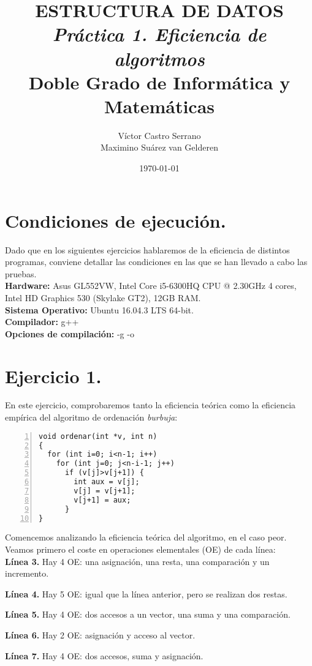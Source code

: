\documentclass[11pt,a4paper]{article}
\title{\textbf{ESTRUCTURA DE DATOS}\\
	   \textit{Práctica 1. Eficiencia de algoritmos}\\
	   \large \vspace{0.25em} Doble Grado de Informática y Matemáticas}
\author{Víctor Castro Serrano\\ Maximino Suárez van Gelderen}
\date{\today}
\begin{document}
\maketitle

\section*{Condiciones de ejecución.}

Dado que en los siguientes ejercicios hablaremos de la eficiencia de distintos programas, conviene detallar las condiciones en las que se han llevado a cabo las pruebas. \\

\textbf{Hardware:} Asus GL552VW, Intel Core i5-6300HQ CPU @ 2.30GHz 4 cores, Intel HD Graphics 530 (Skylake GT2), 12GB RAM. \\
\textbf{Sistema Operativo:} Ubuntu 16.04.3 LTS 64-bit. \\
\textbf{Compilador:} g++ \\
\textbf{Opciones de compilación:} -g -o

\section*{Ejercicio 1.}
En este ejercicio, comprobaremos tanto la eficiencia teórica como la eficiencia empírica del algoritmo de ordenación \emph{burbuja}:

\begin{lstlisting}[numbers=left]
void ordenar(int *v, int n)
{
  for (int i=0; i<n-1; i++)
    for (int j=0; j<n-i-1; j++)
      if (v[j]>v[j+1]) {
        int aux = v[j];
        v[j] = v[j+1];
        v[j+1] = aux;
      }
}
\end{lstlisting}

Comencemos analizando la eficiencia teórica del algoritmo, en el caso peor. Veamos primero el coste en operaciones elementales (OE) de cada línea:\\

\textbf{Línea 3.} Hay 4 OE: una asignación, una resta, una comparación y un incremento.

\textbf{Línea 4.} Hay 5 OE: igual que la línea anterior, pero se realizan dos restas.

\textbf{Línea 5.} Hay 4 OE: dos accesos a un vector, una suma y una comparación.

\textbf{Línea 6.} Hay 2 OE: asignación y acceso al vector.

\textbf{Línea 7.} Hay 4 OE: dos accesos, suma y asignación.
\end{document}
